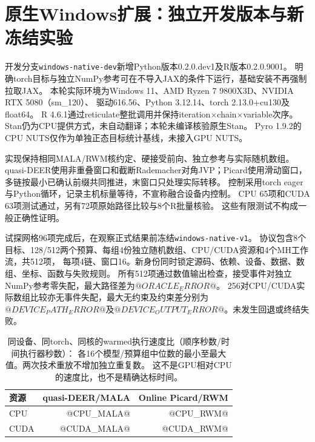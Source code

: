 \section{原生Windows扩展：独立开发版本与新冻结实验}
\label{sec:windows-native}

开发分支\texttt{windows-native-dev}新增Python版本0.2.0.dev1及R版本0.2.0.9001。
明确torch目标与独立NumPy参考可在不导入JAX的条件下运行，基础安装不再强制拉取JAX。
本轮实际环境为Windows 11、AMD Ryzen 7 9800X3D、NVIDIA RTX 5080（sm\_120）、
驱动616.56、Python 3.12.14、torch 2.13.0+cu130及float64。
R 4.6.1通过reticulate整批调用并保持iteration$\times$chain$\times$variable次序。
Stan仍为CPU提供方式，未自动翻译；本轮未编译核验原生Stan。
Pyro 1.9.2的CPU NUTS仅作为单独正态目标统计基线，未接入GPU NUTS。

实现保持相同MALA/RWM核约定、硬接受前向、独立参考与实际随机数组。
quasi-DEER使用非重叠窗口和截断Rademacher对角JVP；Picard使用滑动窗口，
多链按最小已确认前缀共同推进，末窗口只处理实际转移。
控制采用torch eager与Python循环，记录主机标量等待，不宣称融合设备内控制。
CPU 65项和CUDA 63项测试通过，另有72项原始路径比较与8个R批量核验。
这些有限测试不构成一般正确性证明。

试探网格96项完成后，在观察正式结果前冻结\texttt{windows-native-v1}。
协议包含8个目标、128/512两个预算、每组4份独立随机数组、CPU/CUDA资源和4个MH工作流，共512项，
每项4链、窗口16。新身份同时锁定源码、依赖、设备、数据、数组、坐标、函数与失败规则。
所有512项通过数值输出检查，接受事件对独立NumPy参考零失配，最大路径差为$@ORACLE_ERROR@$。
256对CPU/CUDA实际数组比较亦无事件失配，最大无约束及约束差分别为
$@DEVICE_PATH_ERROR@$及$@DEVICE_OUTPUT_ERROR@$。未发生回退或终结失败。

\begin{table}[htbp]\centering\small
\begin{tabular}{lrr}\toprule
资源 & quasi-DEER/MALA & Online Picard/RWM\\\midrule
CPU & @CPU_MALA@ & @CPU_RWM@\\
CUDA & @CUDA_MALA@ & @CUDA_RWM@\\\bottomrule
\end{tabular}
\caption{同设备、同torch、同核的warmed执行速度比（顺序秒数/时间执行器秒数）：
各16个模型/预算组中位数的最小至最大值。两次技术重放不增加独立重复数。
这不是GPU相对CPU的速度比，也不是精确达标时间。}
\end{table}

